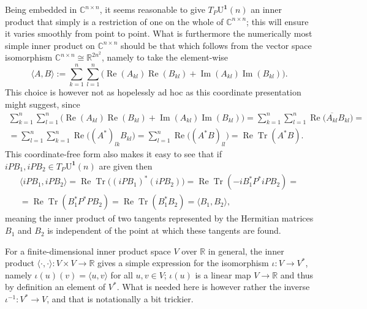\documentclass{article}
\newcommand{\C}{\mathbb{C}}
\newcommand{\R}{\mathbb{R}}
\newcommand{\Fpil}{\longrightarrow}
\newcommand{\vek}{\mathbf}
\newcommand{\UOne}{\mathrm{U}^{\vek{1}}}
\newcommand{\re}{\mathop{\mathrm{Re}}}
\newcommand{\im}{\mathop{\mathrm{Im}}}
\newcommand{\Tr}{\mathop{\mathrm{Tr}}}
\theoremstyle{definition}
\begin{document}
Being embedded in $\C^{n \times n}$, it seems reasonable to give 
$T_P\UOne(n)$ an inner product that simply is a restriction of one on 
the whole of $\C^{n \times n}$; this will ensure it varies smoothly 
from point to point. What is furthermore the numerically most simple 
inner product on $\C^{n \times n}$ should be that which follows from 
the vector space isomorphism \(\C^{n \times n} \cong \R^{2n^2}\), 
namely to take the element-wise
\begin{equation}
  \langle A, B \rangle :=
  \sum_{k=1}^n \sum_{l=1}^n \bigl( \re(A_{kl}) \re(B_{kl}) +
    \im(A_{kl}) \im(B_{kl}) \bigr)
  \text{.}
\end{equation}
This choice is however not as hopelessly ad hoc as this coordinate 
presentation might suggest, since
\begin{multline}
  \sum_{k=1}^n \sum_{l=1}^n \bigl( \re(A_{kl}) \re(B_{kl}) +
    \im(A_{kl}) \im(B_{kl}) \bigr)
  =
  \sum_{k=1}^n \sum_{l=1}^n \re \bigl( \overline{A_{kl}} B_{kl} \bigr)
  = \\ =
  \sum_{l=1}^n \sum_{k=1}^n \re \bigl( (A^*)_{lk} B_{kl} \bigr)
  =
  \sum_{l=1}^n \re \bigl( (A^* B)_{ll} \bigr)
  =
  \re \Tr (A^* B) \text{.}
\end{multline}
This coordinate-free form also makes it easy to see that if \(iPB_1, 
iPB_2 \in T_P\UOne(n)\) are given then
\begin{multline*}
  \langle iPB_1, iPB_2 \rangle =
  \re \Tr \bigl( (iPB_1)^* (iPB_2) \bigr) =
  \re \Tr ( -i B_1^* P^* i P B_2 ) = \\ =
  \re \Tr ( B_1^* P^* P B_2 ) = 
  \re \Tr ( B_1^* B_2 ) =
  \langle B_1, B_2 \rangle \text{,}
\end{multline*}
meaning the inner product of two tangents represented by the 
Hermitian matrices $B_1$ and $B_2$ is independent of the point at 
which these tangents are found.

For a finite-dimensional inner product space $V$ over $\R$ in 
general, the inner product \(\langle \cdot, \cdot \rangle \colon 
V \times V \Fpil \R\) gives a simple expression for the isomorphism 
\(\iota\colon V \Fpil V^*\), namely \(\iota(u)(v) = \langle u, 
v\rangle\) for all \(u,v \in V\); $\iota(u)$ is a linear map \(V 
\Fpil \R\) and thus by definition an element of $V^*$. What is needed 
here is however rather the inverse $\iota^{-1}\colon V^* \Fpil V$, 
and that is notationally a bit trickier. 
\end{document}

